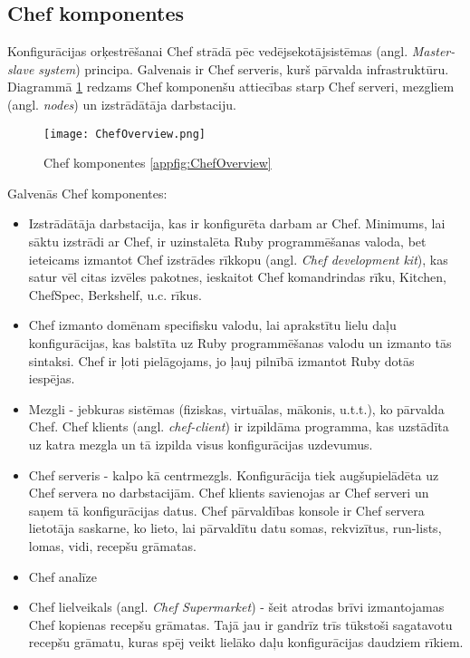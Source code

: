 \subsection{Chef komponentes}
Konfigurācijas orķestrēšanai Chef strādā pēc vedējsekotājsistēmas (angl. \textit{Master-slave system}) principa. Galvenais ir Chef serveris, kurš pārvalda infrastruktūru.
Diagrammā \ref{fig:ChefOverview} redzams Chef komponenšu attiecības starp Chef serveri, mezgliem (angl. \textit{nodes}) un izstrādātāja darbstaciju.
\begin{figure}[H]%
	\centering
	\captionsetup{justification=centering}
	\texttt{[image: ChefOverview.png]}
	\caption{Chef komponentes \ref{appfig:ChefOverview}}
	\label{fig:ChefOverview}
\end{figure}
Galvenās Chef komponentes:
\begin{itemize}
	\item Izstrādātāja darbstacija, kas ir konfigurēta darbam ar Chef. Minimums, lai sāktu izstrādi ar Chef, ir uzinstalēta Ruby programmēšanas valoda, bet ieteicams izmantot Chef izstrādes rīkkopu (angl. \textit{Chef development kit}), kas satur vēl citas izvēles pakotnes, ieskaitot Chef komandrindas rīku, Kitchen, ChefSpec, Berkshelf, u.c. rīkus.
	\item Chef izmanto domēnam specifisku valodu, lai aprakstītu lielu daļu konfigurācijas, kas balstīta uz Ruby programmēšanas valodu un izmanto tās sintaksi. Chef ir ļoti pielāgojams, jo ļauj pilnībā izmantot Ruby dotās iespējas.
	\item Mezgli - jebkuras sistēmas (fiziskas, virtuālas, mākonis, u.t.t.), ko pārvalda Chef. Chef klients (angl. \textit{chef-client}) ir izpildāma programma, kas uzstādīta uz katra mezgla un tā izpilda visus konfigurācijas uzdevumus.
	\item Chef serveris - kalpo kā centrmezgls. Konfigurācija tiek augšupielādēta uz Chef servera no darbstacijām. Chef klients savienojas ar Chef serveri un saņem tā konfigurācijas datus.
	Chef pārvaldības konsole ir Chef servera lietotāja saskarne, ko lieto, lai pārvaldītu datu somas, rekvizītus, run-lists, lomas, vidi, recepšu grāmatas.
	\item Chef analīze
	\item Chef lielveikals (angl. \textit{Chef Supermarket}) - šeit atrodas brīvi izmantojamas Chef kopienas recepšu grāmatas. Tajā jau ir gandrīz trīs tūkstoši sagatavotu recepšu grāmatu, kuras spēj veikt lielāko daļu konfigurācijas daudziem rīkiem.
\end{itemize}



